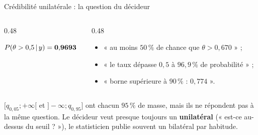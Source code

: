 \begin{frame}{Crédibilité unilatérale : la question du décideur}
\small
\begin{columns}[t]
\begin{column}{0.48\textwidth}
\begin{ebox}
\vspace{1.5mm}

$P(\theta > 0{,}5 \,\vert\, y) = \mathbf{0{,}9693}$
\end{ebox}
\end{column}
\begin{column}{0.48\textwidth}
\begin{solbox}
\footnotesize
\begin{itemize}
  \item « au moins $50\,\%$ de chance que $\theta > 0{,}670$ » ;
  \item « le taux dépasse $0{,}5$ à $96{,}9\,\%$ de probabilité » ;
  \item « borne supérieure à $90\,\%$ : $0{,}774$ ».
\end{itemize}
\end{solbox}
\end{column}
\end{columns}
\vspace{1mm}
\begin{kbox}
$[q_{0{,}05} ; +\infty[$ et $]-\infty ; q_{0{,}95}]$ ont chacun $95\,\%$ de masse,
mais ils ne répondent pas à la même question. Le décideur veut presque toujours
un \textbf{unilatéral} (« est-ce au-dessus du seuil ? »), le statisticien publie
souvent un bilatéral par habitude.
\end{kbox}
\end{frame}

